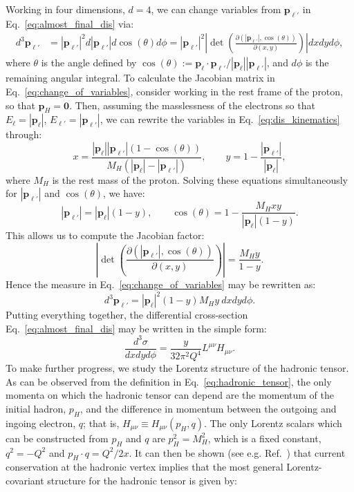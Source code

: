 \documentclass[withindex,glossary]{cam-thesis}
\renewcommand{\vec}[1]{\textbf{#1}} %
\begin{document}
Working in four dimensions, $d=4$, we can change variables from $\vec{p}_{\ell'}$ in Eq.~\eqref{eq:almost_final_dis} via:
\begin{align}
d^{3} \vec{p}_{\ell'} &= |\vec{p}_{\ell'}|^{2} d|\vec{p}_{\ell'}| d\cos(\theta) d\phi = |\vec{p}_{\ell'}|^{2}\left|\det\left(\frac{\partial (|\vec{p}_{\ell'}|, \cos(\theta))}{\partial(x, y)}\right) \right| dx dy d\phi,
\label{eq:change_of_variables}
\end{align}
where $\theta$ is the angle defined by $\cos(\theta) := \vec{p}_{\ell} \cdot \vec{p}_{\ell'} / |\vec{p}_{\ell}| |\vec{p}_{\ell'}|$, and $d\phi$ is the remaining angular integral. To calculate the Jacobian matrix in Eq.~\eqref{eq:change_of_variables}, consider working in the rest frame of the proton, so that $\vec{p}_H = \vec{0}$. Then, assuming the masslessness of the electrons so that $E_{\ell} = |\vec{p}_{\ell}|$, $E_{\ell'} = |\vec{p}_{\ell'}|$, we can rewrite the variables in Eq.~\eqref{eq:dis_kinematics} through:
\begin{equation}
\label{eq:change_of_variables}
x = \frac{|\vec{p}_{\ell}| |\vec{p}_{\ell'}| \left(1 - \cos(\theta)\right)}{M_H (|\vec{p}_{\ell}| - |\vec{p}_{\ell'}|)}, \qquad y = 1 - \frac{|\vec{p}_{\ell'}|}{|\vec{p}_{\ell}|},
\end{equation}
where $M_H$ is the rest mass of the proton. Solving these equations simultaneously for $|\vec{p}_{\ell'}|$ and $\cos(\theta)$, we have:
\begin{equation}
|\vec{p}_{\ell'}| = |\vec{p}_{\ell}|(1-y), \qquad \cos(\theta) = 1 - \frac{M_H xy}{|\vec{p}_{\ell}|(1-y)}.
\end{equation}
This allows us to compute the Jacobian factor:
\begin{equation}
\left|\det\left(\frac{\partial (|\vec{p}_{\ell'}|, \cos(\theta))}{\partial(x, y)}\right) \right| = \frac{M_H y}{1-y}.
\end{equation}
Hence the measure in Eq.~\eqref{eq:change_of_variables} may be rewritten as:
\begin{equation}
d^{3} \vec{p}_{\ell'} =  |\vec{p}_{\ell}|^2 (1-y) M_H y \ dx dy d\phi.
\end{equation}
Putting everything together, the differential cross-section Eq.~\eqref{eq:almost_final_dis} may be written in the simple form:
\begin{equation}
\frac{d^3\sigma}{dx dy d\phi} = \frac{y}{32 \pi^2 Q^4} L^{\mu\nu} H_{\mu\nu}.
\end{equation}
To make further progress, we study the Lorentz structure of the hadronic tensor. As can be observed from the definition in Eq.~\eqref{eq:hadronic_tensor}, the only momenta on which the hadronic tensor can depend are the momentum of the initial hadron, $p_H$, and the difference in momentum between the outgoing and ingoing electron, $q$; that is, $H_{\mu\nu} \equiv H_{\mu\nu}(p_H, q)$. The only Lorentz scalars which can be constructed from $p_H$ and $q$ are $p_H^2 = M_H^2$, which is a fixed constant, $q^2 = -Q^2$ and $p_H \cdot q = Q^2/2x$. It can then be shown (see e.g. Ref.~\cite{Halzen:1984mc}) that current conservation at the hadronic vertex implies that the most general Lorentz-covariant structure for the hadronic tensor is given by:
\end{document}

